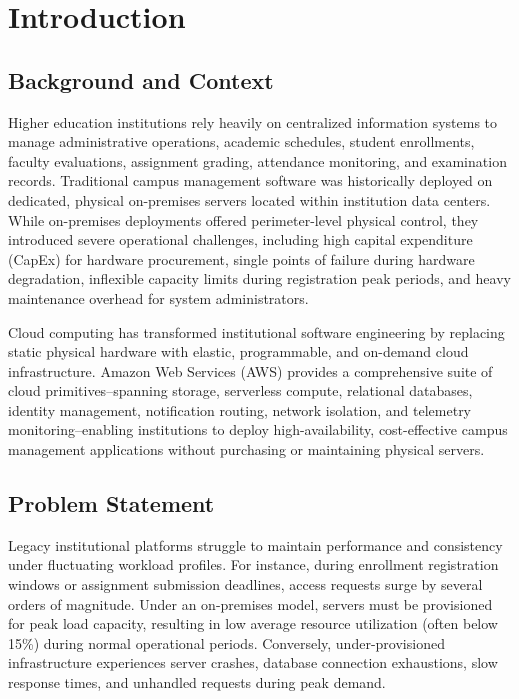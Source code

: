 \chapter{Introduction}
\label{chap:introduction}

\section{Background and Context}
Higher education institutions rely heavily on centralized information systems to manage administrative operations, academic schedules, student enrollments, faculty evaluations, assignment grading, attendance monitoring, and examination records. Traditional campus management software was historically deployed on dedicated, physical on-premises servers located within institution data centers. While on-premises deployments offered perimeter-level physical control, they introduced severe operational challenges, including high capital expenditure (CapEx) for hardware procurement, single points of failure during hardware degradation, inflexible capacity limits during registration peak periods, and heavy maintenance overhead for system administrators.

Cloud computing has transformed institutional software engineering by replacing static physical hardware with elastic, programmable, and on-demand cloud infrastructure. Amazon Web Services (AWS) provides a comprehensive suite of cloud primitives--spanning storage, serverless compute, relational databases, identity management, notification routing, network isolation, and telemetry monitoring--enabling institutions to deploy high-availability, cost-effective campus management applications without purchasing or maintaining physical servers.

\section{Problem Statement}
Legacy institutional platforms struggle to maintain performance and consistency under fluctuating workload profiles. For instance, during enrollment registration windows or assignment submission deadlines, access requests surge by several orders of magnitude. Under an on-premises model, servers must be provisioned for peak load capacity, resulting in low average resource utilization (often below 15\%) during normal operational periods. Conversely, under-provisioned infrastructure experiences server crashes, database connection exhaustions, slow response times, and unhandled requests during peak demand.

